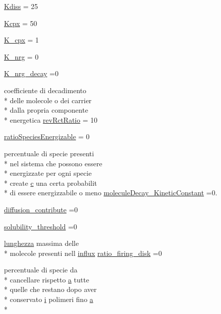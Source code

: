 \begin{DoxyCompactItemize}
\hyperlink{a00113_a51a314f9df0eaa4488a1b264d1de0173}{Kdiss} = 25
\item 
\hyperlink{a00113_aaea32371e0f1645dcea44ce4d4a3d147}{Kcpx} = 50
\item 
\hyperlink{a00113_a26dbdfeb290332837753db666ee56981}{K\+\_\+cpx} = 1
\item 
\hyperlink{a00113_ac8f2b2a8d859ca2b7cf056575c7b0538}{K\+\_\+nrg} = 0
\item 
\hyperlink{a00113_abd02c282e86e2173abc6daed03f73584}{K\+\_\+nrg\+\_\+decay} =0
\item 
coefficiente di decadimento \\*
delle molecole o dei carrier \\*
dalla propria componente \\*
energetica \hyperlink{a00113_aa7d97d27bd1a172a2f0ad49ef13ef8ac}{rev\+Rct\+Ratio} = 10
\item 
\hyperlink{a00113_a1fa680d8b3a4f885d99f56fef41d2c37}{ratio\+Species\+Energizable} = 0
\item 
percentuale di specie presenti \\*
nel sistema che possono essere \\*
energizzate per ogni specie \\*
create \hyperlink{a00035_a6be92348ba85ef257b11d06209e1d7b6}{c} una certa probabilit \\*
di essere energizzabile o meno \hyperlink{a00113_a85569bbcfd8fbc0081b5a144eaf516f5}{molecule\+Decay\+\_\+\+Kinetic\+Constant} =0.
\item 
\hyperlink{a00113_a9341167cb56ed18499df723220990b9c}{diffusion\+\_\+contribute} =0
\item 
\hyperlink{a00113_acbefa7c9bfd826fec9b32fa3bd29c288}{solubility\+\_\+threshold} =0
\item 
\hyperlink{a00106_a984d293145d85a936f430c0990316e51}{lunghezza} massima delle \\*
molecole presenti nell \hyperlink{a00107_a902e747aeec6b345d3a057099152f41f}{influx} \hyperlink{a00113_a83c1660d71068ae836121af0890bb3dd}{ratio\+\_\+firing\+\_\+disk} =0
\item 
percentuale di specie da \\*
cancellare rispetto \hyperlink{a00035_a2ffdbad9ea59541e59cbd2b938e0770c}{a} tutte \\*
quelle che restano dopo aver \\*
conservato \hyperlink{a00113_ad3efca1ea6e3333daf30719ee0501862}{i} polimeri fino \hyperlink{a00035_a2ffdbad9ea59541e59cbd2b938e0770c}{a} \\*

\end{DoxyCompactItemize}
